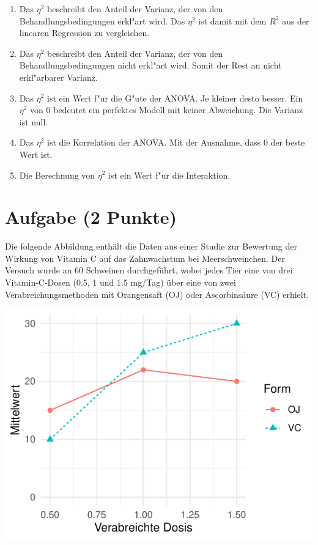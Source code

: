 \documentclass[a4paper, 10pt]{scrartcl}\usepackage[]{graphicx}\usepackage[]{xcolor}
\makeatletter
\def\maxwidth{ %
  \ifdim\Gin@nat@width>\linewidth
    \linewidth
  \else
    \Gin@nat@width
  \fi
}
\makeatother
\begin{document}
\begin{enumerate}
\item [\textbf{A} \msquare] Das $\eta^2$ beschreibt den Anteil der Varianz, der von den Behandlungsbedingungen erkl{"a}rt wird. Das $\eta^2$ ist damit mit dem $R^2$ aus der linearen Regression zu vergleichen.
\item [\textbf{B} \msquare] Das $\eta^2$ beschreibt den Anteil der Varianz, der von den Behandlungsbedingungen nicht erkl{"a}rt wird. Somit der Rest an nicht erkl{"a}rbarer Varianz.
\item [\textbf{C} \msquare] Das $\eta^2$ ist ein Wert f{"u}r die G{"u}te der ANOVA. Je kleiner desto besser. Ein $\eta^2$ von 0 bedeutet ein perfektes Modell mit keiner Abweichung. Die Varianz ist null.
\item [\textbf{D} \msquare] Das $\eta^2$ ist die Korrelation der ANOVA. Mit der Ausnahme, dass 0 der beste Wert ist.
\item [\textbf{E} \msquare] Die Berechnung von $\eta^2$ ist ein Wert f{"u}r die Interaktion.
\end{enumerate} 

\section{Aufgabe \hfill (2 Punkte)}

Die folgende Abbildung enth{\"a}lt die Daten aus einer Studie zur
Bewertung der Wirkung von Vitamin C auf das Zahnwachstum bei
Meerschweinchen. Der Versuch wurde an 60 Schweinen durchgef{\"u}hrt, wobei
jedes Tier eine von drei Vitamin-C-Dosen (0.5, 1 und 1.5 mg/Tag) {\"u}ber eine
von zwei Verabreichungsmethoden mit Orangensaft (OJ)  oder
Ascorbins{\"a}ure (VC) erhielt. 



{\centering \includegraphics[width=\maxwidth]{img/mc-anova-02-a-1} 

}
\end{document}
